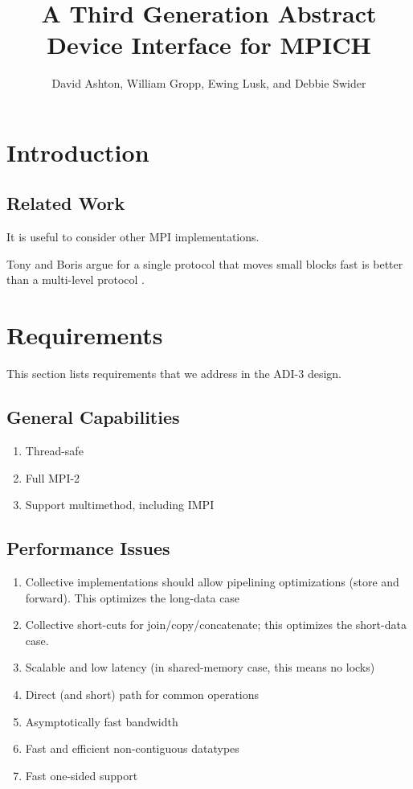\documentclass{article}
\begin{document}
\title{A Third Generation Abstract Device Interface for MPICH}
\author{David Ashton, William Gropp, Ewing Lusk, and Debbie Swider}
\maketitle

\section{Introduction}

\subsection{Related Work}
It is useful to consider other MPI implementations.

Tony and Boris argue for a single protocol that moves small blocks fast is
better than a multi-level protocol \cite{techreport}.

\section{Requirements}
This section lists requirements that we address in the ADI-3 design.

\subsection{General Capabilities}
\begin{enumerate}
\item Thread-safe
\item Full MPI-2
\item Support multimethod, including IMPI
\end{enumerate}

\subsection{Performance Issues}
\begin{enumerate}
\item Collective implementations should allow pipelining optimizations (store
  and forward).  This optimizes the long-data case
\item Collective short-cuts for join/copy/concatenate; this optimizes the
  short-data case.
\item Scalable and low latency (in shared-memory case, this means no locks)
\item Direct (and short) path for common operations
\item Asymptotically fast bandwidth
\item Fast and efficient non-contiguous datatypes
\item Fast one-sided support
\end{enumerate}
\end{document}
